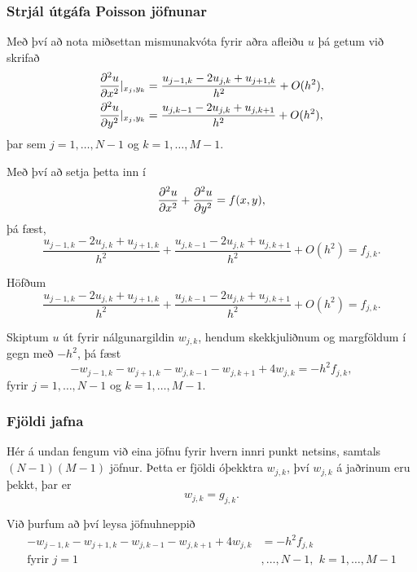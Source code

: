 \documentclass[icelandic,a4paper,12pt]{article}
\begin{document}
\subsubsection{Strjál útgáfa Poisson jöfnunar}
 Með því að nota miðsettan mismunakvóta fyrir aðra afleiðu $u$ þá getum við 
 skrifað
 \begin{align*}
  \frac{{\partial}^2 u}{{\partial} x^2}|_{x_j,y_k} &= \frac{u_{j-1,k} - 2u_{j,k} + u_{j+1,k}}{h^2}
  + O(h^2), \\
  \frac{{\partial}^2 u}{{\partial} y^2}|_{x_j,y_k} &= \frac{u_{j,k-1} - 2u_{j,k} + u_{j,k+1}}{h^2}
  + O(h^2), 
 \end{align*}
 þar sem $j = 1,\ldots,N-1$ og $k=1,\ldots,M-1$.

\medskip\pause
Með því að setja þetta inn í 
  $$ 
    \frac{{\partial}^2 u}{{\partial} x^2} + \frac{{\partial}^2 u}{{\partial} y^2} = f(x,y),
  $$
  þá fæst, \pause 
  $$
  \frac{u_{j-1,k} - 2u_{j,k} + u_{j+1,k}}{h^2} +
  \frac{u_{j,k-1} - 2u_{j,k} + u_{j,k+1}}{h^2}
  + O(h^2) = f_{j,k}.
  $$

  
Höfðum 
$$
  \frac{u_{j-1,k} - 2u_{j,k} + u_{j+1,k}}{h^2} +
  \frac{u_{j,k-1} - 2u_{j,k} + u_{j,k+1}}{h^2}
  + O(h^2) = f_{j,k}.
  $$
\pause\medskip
  
  Skiptum $u$ út fyrir nálgunargildin $w_{j,k}$, hendum skekkjuliðnum og
  margföldum í gegn með $-h^2$, \pause þá fæst
  $$
  -w_{j-1,k} - w_{j+1,k} - w_{j,k-1} - w_{j,k+1} + 4w_{j,k} = -h^2 f_{j,k},
  $$
 fyrir $j = 1,\ldots,N-1$ og $k=1,\ldots,M-1$.


\subsubsection{Fjöldi jafna}
 Hér á undan fengum við eina jöfnu fyrir hvern innri punkt netsins, 
 samtals $(N-1)(M-1)$ jöfnur. Þetta er fjöldi óþekktra $w_{j,k}$, því
 $w_{j,k}$ á jaðrinum eru þekkt, þar er 
 $$
    w_{j,k} = g_{j,k}.
 $$
 
 \pause\medskip
 Við þurfum að því leysa jöfnuhneppið
 \begin{align*}
  -w_{j-1,k} - w_{j+1,k} - w_{j,k-1} - w_{j,k+1} + 4w_{j,k} &= -h^2 f_{j,k} \\ 
   \text{fyrir } j=1&,\ldots,N-1, \ \, k=1,\ldots,M-1\\
 \end{align*}
\end{document}
